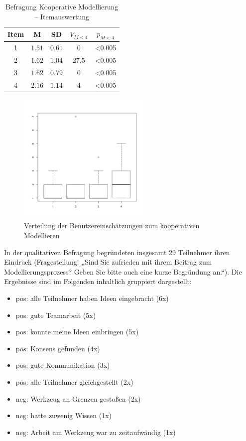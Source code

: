 \begin{table}[htbp]
	\centering
	\caption{Befragung Kooperative Modellierung -- Itemauswertung}

\begin{tabular}{| c || c | c || c | c |}
  \hline
   Item & M & SD & $V_{M<4}$ & $p_{M<4}$ \\ \hline
   1 & $1.51$ & $0.61$ & 0 & <0.005 \\ 
   2 & $1.62$ & $1.04$ & 27.5 & <0.005 \\ 
   3 & $1.62$ & $0.79$ & 0 & <0.005 \\ 
   4 & $2.16$ & $1.14$ & 4 & <0.005 \\ \hline
\end{tabular}
	\label{tab:kooperative_modellierung}
\end{table}

\begin{figure}[htbp]
	\centering
		\includegraphics[height=2.5in]{img/Evaluierung/kollaboration.png}
	\caption{Verteilung der Benutzereinschätzungen zum kooperativen Modellieren}
	\label{fig:img_Evaluierung_kollaboration}
\end{figure}

In der qualitativen Befragung begründeten insgesamt 29 Teilnehmer ihren Eindruck (Fragestellung: „Sind Sie zufrieden mit ihrem Beitrag zum Modellierungsprozess? Geben Sie bitte auch eine kurze Begründung an.“). Die Ergebnisse sind im Folgenden inhaltlich gruppiert dargestellt:

\begin{itemize}
 \item pos: alle Teilnehmer haben Ideen eingebracht (6x)
 \item pos: gute Teamarbeit (5x)
 \item pos: konnte meine Ideen einbringen (5x)
 \item pos: Konsens gefunden (4x)
 \item pos: gute Kommunikation (3x)
 \item pos: alle Teilnehmer gleichgestellt (2x)
 \item neg: Werkzeug an Grenzen gestoßen (2x)
 \item neg: hatte zuwenig Wissen (1x)
 \item neg: Arbeit am Werkzeug war zu zeitaufwändig (1x)
\end{itemize}

